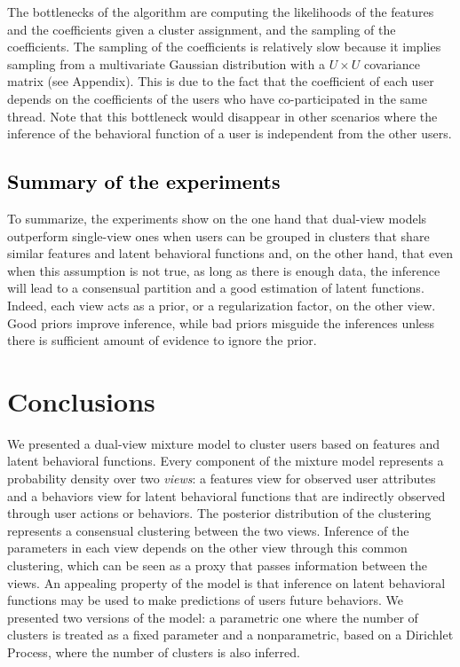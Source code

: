 \documentclass[smallextended]{svjour3}          %
\newcommand\alberto[1]{\textcolor{black}{#1}}
\begin{document}

The bottlenecks of the algorithm are computing the likelihoods of the features and the coefficients given a cluster assignment, and the sampling of the coefficients. The sampling of the coefficients is relatively slow because it implies sampling from a multivariate Gaussian distribution with a $U\times U$ covariance matrix (see Appendix). This is due to the fact that the coefficient of each user depends on the coefficients of the users who have co-participated in the same thread. Note that this bottleneck would disappear in other scenarios where the inference of the behavioral function of a user is independent from the other users.


\subsection{\alberto{Summary of the experiments}}
To summarize, the experiments show on the one hand that dual-view models outperform single-view ones when users can be grouped in clusters that share similar features and latent behavioral functions and, on the other hand, that even when this assumption is not true, as long as there is enough data, the inference will lead to a consensual partition and a good estimation of latent functions. Indeed, each view acts as a prior, or a regularization factor, on the other view. Good priors improve inference, while bad priors misguide the inferences unless there is sufficient amount of evidence to ignore the prior.

\section{Conclusions}\label{sec:conclusions}

We presented a dual-view mixture model to cluster users based on features and latent behavioral functions. Every component of the mixture model represents a probability density over two \textit{views}: a features view for observed user attributes and a
behaviors view for latent behavioral functions that are indirectly observed through user actions or behaviors. The posterior distribution of the clustering represents a consensual clustering between the two views. Inference of the parameters in each view depends on the other view through this common clustering, which can be seen as a proxy that passes information between the views. An appealing property of the model is that inference on latent behavioral functions may be used to make predictions of users future behaviors. We presented two versions of the model: a parametric one where the number of clusters is treated as a fixed parameter and a nonparametric, based on a Dirichlet Process, where the number of clusters is also inferred.
\end{document}
